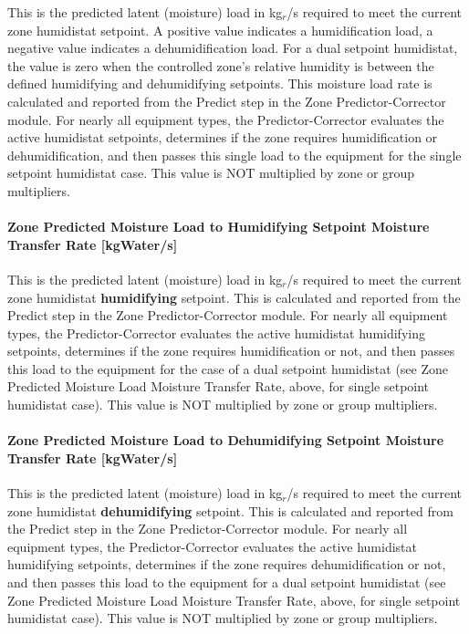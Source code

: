 This is the predicted latent (moisture) load in kg\(_{r}\)/s required to meet the current zone humidistat setpoint. A positive value indicates a humidification load, a negative value indicates a dehumidification load. For a dual setpoint humidistat, the value is zero when the controlled zone's relative humidity is between the defined humidifying and dehumidifying setpoints. This moisture load rate is calculated and reported from the Predict step in the Zone Predictor-Corrector module. For nearly all equipment types, the Predictor-Corrector evaluates the active humidistat setpoints, determines if the zone requires humidification or dehumidification, and then passes this single load to the equipment for the single setpoint humidistat case. This value is NOT multiplied by zone or group multipliers.

\paragraph{Zone Predicted Moisture Load to Humidifying Setpoint Moisture Transfer Rate {[}kgWater/s{]}}

This is the predicted latent (moisture) load in kg\(_{r}\)/s required to meet the current zone humidistat \textbf{humidifying} setpoint. This is calculated and reported from the Predict step in the Zone Predictor-Corrector module. For nearly all equipment types, the Predictor-Corrector evaluates the active humidistat humidifying setpoints, determines if the zone requires humidification or not, and then passes this load to the equipment for the case of a dual setpoint humidistat (see Zone Predicted Moisture Load Moisture Transfer Rate, above, for single setpoint humidistat case). This value is NOT multiplied by zone or group multipliers.

\paragraph{Zone Predicted Moisture Load to Dehumidifying Setpoint Moisture Transfer Rate {[}kgWater/s{]}}

This is the predicted latent (moisture) load in kg\(_{r}\)/s required to meet the current zone humidistat \textbf{dehumidifying} setpoint. This is calculated and reported from the Predict step in the Zone Predictor-Corrector module. For nearly all equipment types, the Predictor-Corrector evaluates the active humidistat humidifying setpoints, determines if the zone requires dehumidification or not, and then passes this load to the equipment for a dual setpoint humidistat (see Zone Predicted Moisture Load Moisture Transfer Rate, above, for single setpoint humidistat case). This value is NOT multiplied by zone or group multipliers.

